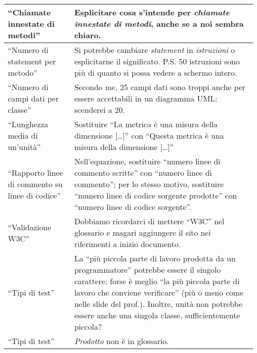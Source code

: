\documentclass[a4paper]{article}
\begin{document}
\begin{longtable}{| p{3cm} | p{10cm} |}
	“Chiamate innestate di metodi” & Esplicitare cosa s'intende per \emph{chiamate innestate di metodi}, anche se a noi sembra chiaro. \\ \hline
	“Numero di statement per metodo” & Si potrebbe cambiare \emph{statement} in \emph{istruzioni} o esplicitarne il significato. P.S. 50 istruzioni sono più di quanto si possa vedere a schermo intero. \\ \hline
	“Numero di campi dati per classe” & Secondo me, 25 campi dati sono troppi anche per essere accettabili in un diagramma UML: scenderei a 20. \\ \hline
	“Lunghezza media di un'unità” & Sostituire “La metrica è una misura della dimensione [\dots]” con “Questa metrica è una misura della dimensione [\dots]” \\ \hline
	“Rapporto linee di commento su linee di codice” & Nell'equazione, sostituire “numero linee di commento scritte” con “numero linee di commento”; per lo stesso motivo, sostituire “numero linee di codice sorgente prodotte” con “numero linee di codice sorgente”. \\ \hline
	“Validazione W3C” & Dobbiamo ricordarci di mettere “W3C” nel glossario e magari aggiungere il sito nei riferimenti a inizio documento. \\ \hline
	“Tipi di test” & La “più piccola parte di lavoro prodotta da un programmatore” potrebbe essere il singolo carattere; forse è meglio “la più piccola parte di lavoro che conviene verificare” (più o meno come nelle slide del prof.). Inoltre, unità non potrebbe essere anche una singola classe, sufficientemente piccola? \\ \hline
	“Tipi di test” & \emph{Prodotto} non è in glossario. \\ \hline
\end{longtable}
\end{document}

